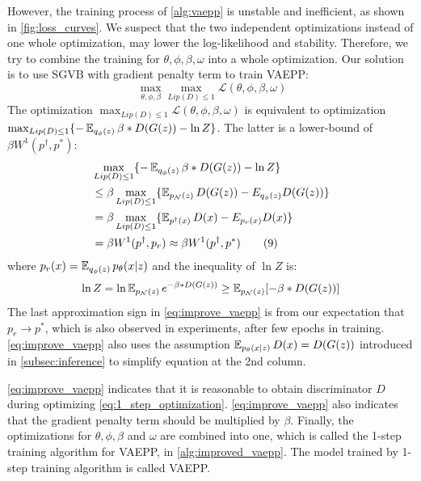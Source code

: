 However, the training process of \cref{alg:vaepp} is unstable and inefficient, as shown in \cref{fig:loss_curves}. 
We suspect that the two independent optimizations instead of one whole optimization, may lower the log-likelihood and stability. Therefore, we try to combine the training for $\theta, \phi, \beta, \omega$ into a whole optimization. 
Our solution is to use SGVB with gradient penalty term to train VAEPP:
\begin{equation*}~\label{eq:1_step_optimization}
	\max_{\theta, \phi, \beta} \max_{Lip(D) \leq 1} \mathcal{L}(\theta, \phi, \beta, \omega) 
\end{equation*} 
The optimization $\max_{Lip(D) \leq 1} \mathcal{L}(\theta, \phi, \beta, \omega)$ is equivalent to optimization $\max_{Lip(D) \leq 1} \{ -\operatorname{\mathbb{E}}_{q_\phi(z)} \beta*D(G(z)) - \ln Z \}$. The latter is a lower-bound of $\beta W^1(p^\dag, p^*)$:
\begin{align*}\label{eq:improve_vaepp}
	&\max_{Lip(D) \leq 1} \{ -\operatorname{\mathbb{E}}_{q_\phi(z)} \beta*D(G(z)) - \ln Z \}\\ 
	&\leq \beta \max_{Lip(D) \leq 1} \{ \operatorname{\mathbb{E}}_{p_\mathcal{N}(z)} D(G(z)) - E_{q_\phi(z)} D(G(z)) \} \\
	&= \beta \max_{Lip(D) \leq 1} \{ \operatorname{\mathbb{E}}_{p^\dag(x)} D(x) - E_{p_r(x)} D(x) \} \\
	&= \beta W^1(p^\dag, p_r) \approx \beta W^1(p^\dag, p^*) \tag{9} 
\end{align*}
where $p_r(x) = \operatorname{\mathbb{E}}_{q_\phi(z)} p_\theta(x|z)$ and the inequality of $\ln Z$ is:
\begin{equation*}
	\ln Z = \ln \operatorname{\mathbb{E}}_{p_\mathcal{N}(z)} e^{- \beta * D(G(z))} \geq \operatorname{\mathbb{E}}_{p_\mathcal{N}(z)} [- \beta * D(G(z))]
\end{equation*}
The last approximation sign in \cref{eq:improve_vaepp} is from our expectation that $p_r \rightarrow p^*$, which is also observed in experiments, after few epochs in training. \cref{eq:improve_vaepp} also uses the assumption $\operatorname{\mathbb{E}}_{p_\theta(x|z)} D(x) = D(G(z))$ introduced in \cref{subsec:inference} to simplify equation at the 2nd column. 

\cref{eq:improve_vaepp} indicates that it is reasonable to obtain  discriminator $D$ during optimizing \cref{eq:1_step_optimization}. \cref{eq:improve_vaepp} also indicates that the gradient penalty term should be multiplied by $\beta$. Finally, the optimizations for $\theta, \phi, \beta$ and $\omega$ are combined into one, which is called the 1-step training algorithm for VAEPP, in \cref{alg:improved_vaepp}. The model trained by 1-step training algorithm is called VAEPP. 

